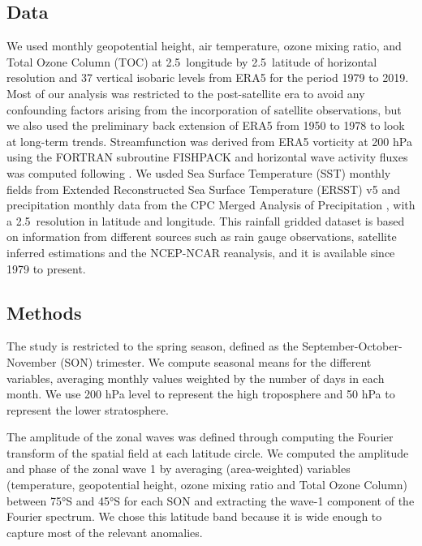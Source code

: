 \documentclass[smallextended]{svjour3}       %
\begin{document}
\hypertarget{data}{%
\subsection{Data}\label{data}}

We used monthly geopotential height, air temperature, ozone mixing ratio, and Total Ozone Column (TOC) at 2.5\degree~longitude by 2.5\degree~latitude of horizontal resolution and 37 vertical isobaric levels from ERA5 \citep{era5} for the period 1979 to 2019.
Most of our analysis was restricted to the post-satellite era to avoid any confounding factors arising from the incorporation of satellite observations, but we also used the preliminary back extension of ERA5 from 1950 to 1978 \citep{era5be} to look at long-term trends.
Streamfunction was derived from ERA5 vorticity at 200 hPa using the FORTRAN subroutine FISHPACK \citep{fishpack} and horizontal wave activity fluxes was computed following \citet{plumb1985}.
We usded Sea Surface Temperature (SST) monthly fields from Extended Reconstructed Sea Surface Temperature (ERSST) v5 \citep{huang2017} and precipitation monthly data from the CPC Merged Analysis of Precipitation \citep{cmap}, with a 2.5\degree~resolution in latitude and longitude.
This rainfall gridded dataset is based on information from different sources such as rain gauge observations, satellite inferred estimations and the NCEP-NCAR reanalysis, and it is available since 1979 to present.

\hypertarget{methods}{%
\subsection{Methods}\label{methods}}

The study is restricted to the spring season, defined as the September-October-November (SON) trimester.
We compute seasonal means for the different variables, averaging monthly values weighted by the number of days in each month.
We use 200 hPa level to represent the high troposphere and 50 hPa to represent the lower stratosphere.

The amplitude of the zonal waves was defined through computing the Fourier transform of the spatial field at each latitude circle.
We computed the amplitude and phase of the zonal wave 1 by averaging (area-weighted) variables (temperature, geopotential height, ozone mixing ratio and Total Ozone Column) between 75°S and 45°S for each SON and extracting the wave-1 component of the Fourier spectrum.
We chose this latitude band because it is wide enough to capture most of the relevant anomalies.
\end{document}
